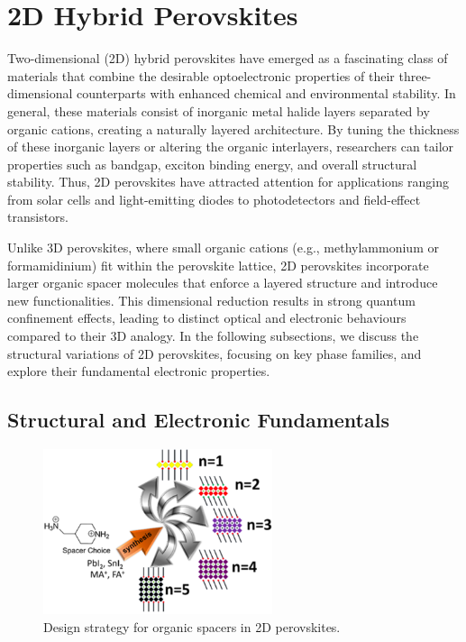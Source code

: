 \section{2D Hybrid Perovskites}\label{section:section2-2}

Two-dimensional (2D) hybrid perovskites have emerged as a fascinating class of materials that combine the desirable optoelectronic properties of their three-dimensional counterparts with enhanced chemical and environmental stability. In general, these materials consist of inorganic metal halide layers separated by organic cations, creating a naturally layered architecture. By tuning the thickness of these inorganic layers or altering the organic interlayers, researchers can tailor properties such as bandgap, exciton binding energy, and overall structural stability. Thus, 2D perovskites have attracted attention for applications ranging from solar cells and light-emitting diodes to photodetectors and field-effect transistors\cite{RN108}.

Unlike 3D perovskites, where small organic cations (e.g., methylammonium or formamidinium) fit within the perovskite lattice, 2D perovskites incorporate larger organic spacer molecules that enforce a layered structure and introduce new functionalities. This dimensional reduction results in strong quantum confinement effects, leading to distinct optical and electronic behaviours compared to their 3D analogy. In the following subsections, we discuss the structural variations of 2D perovskites, focusing on key phase families, and explore their fundamental electronic properties.

\subsection{Structural and Electronic Fundamentals}

\begin{figure}[ht]
    \centering
    \includegraphics[width=0.6\textwidth]{figures/literature-review/figure2-9.png}
    \caption{Design strategy for organic spacers in 2D perovskites\cite{RN144}.}
    \label{fig:figure2.9}
\end{figure}

